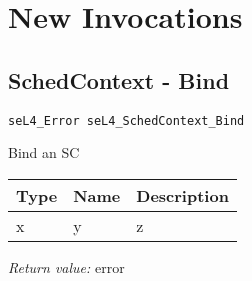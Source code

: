 \newcommand{\apidoc}[6]
{
    \subsection{\label{api:#1}#2}

    \texttt{#4}
    \vspace*{6pt}

    #3

    \begin{tabular}{lll} \toprule
    \textbf{Type} & \textbf{Name} & \textbf{Description} \\
    \midrule
    #5
    \bottomrule
    \end{tabular}
        
    \textit{Return value:} #6 \par

    \vfill
}

\section{New Invocations}

\apidoc
{schedcontext_bind}
{SchedContext - Bind}
{ Bind an SC}
{seL4\_Error seL4\_SchedContext\_Bind}
{x & y & z\\}
{error}

